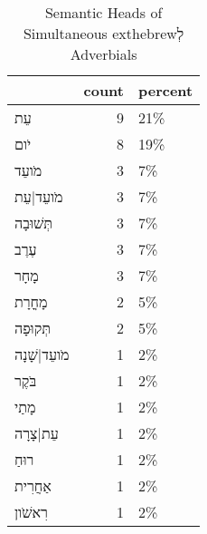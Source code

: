 \begin{table}[htbp!]
\centering
\caption{Semantic Heads of Simultaneous 	exthebrew{לְ} Adverbials}
\label{table:siml_head_cp}
\begin{tabular}{lrl}
\toprule
{} &  count & percent \\
\midrule
עֵת           &      9 &     21\% \\
יֹום          &      8 &     19\% \\
מֹועֵד        &      3 &      7\% \\
מֹועֵד|עֵת    &      3 &      7\% \\
תְּשׁוּבָה    &      3 &      7\% \\
עֶרֶב         &      3 &      7\% \\
מָחָר         &      3 &      7\% \\
מָחֳרָת       &      2 &      5\% \\
תְּקוּפָה     &      2 &      5\% \\
מֹועֵד|שָׁנָה &      1 &      2\% \\
בֹּקֶר        &      1 &      2\% \\
מָתַי         &      1 &      2\% \\
עֵת|צָרָה     &      1 &      2\% \\
רוּחַ         &      1 &      2\% \\
אַחֲרִית      &      1 &      2\% \\
רִאשֹׁון      &      1 &      2\% \\
\bottomrule
\end{tabular}
\end{table}
